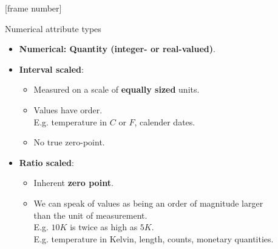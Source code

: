 \documentclass[aspectratio=169,t]{beamer}
\begin{document}
  {
    [frame number]
    \begin{frame}{Numerical attribute types}
    \begin{itemize}
        \item \textbf{Numerical: Quantity (integer- or real-valued)}.
        \item \textbf{Interval scaled}:
            \begin{itemize}
                \item Measured on a scale of \textbf{equally sized} units.
                \item Values have order.\\
                      E.g. temperature in $C$ or $F$, calender dates.
                \item No true zero-point.
            \end{itemize}
        \item \textbf{Ratio scaled}:
        \begin{itemize}
            \item Inherent \textbf{zero point}.
            \item We can speak of values as being an order of magnitude larger \\
            than the unit of measurement.\\
            E.g. $10 K$ is twice as high as $5 K$.\\
            E.g. temperature in Kelvin, length, counts, monetary quantities.
        \end{itemize}
        \end{itemize}
    \end{frame}
  }
\end{document}
